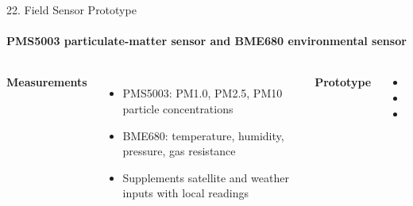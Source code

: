 \begin{frame}{22. Field Sensor Prototype}
\framesubtitle{PMS5003 particulate-matter sensor and BME680 environmental sensor}
\scriptsize
\begin{columns}[T,onlytextwidth]
    \textbf{\textcolor{amritaMaroon}{Measurements}}
    \begin{itemize}\setlength\itemsep{2pt}
        \item PMS5003: PM1.0, PM2.5, PM10 particle concentrations
        \item BME680: temperature, humidity, pressure, gas resistance
        \item Supplements satellite and weather inputs with local readings
    \end{itemize}
    \textbf{\textcolor{amritaMaroon}{Prototype}}
    \begin{itemize}\setlength\itemsep{2pt}
        \item {}
        \item {}
        \item {}
    \end{itemize}
\end{columns}
\vspace{0.2cm}
\begin{center}\end{center}
\end{frame}

